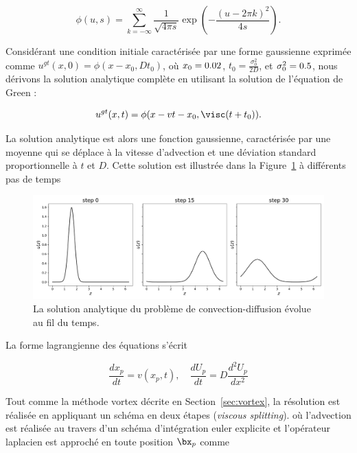 \begin{equation*}
    \phi(u, s) = \sum_{k=-\infty}^{\infty} \frac{1}{\sqrt{4 \pi s}} \exp{\left(-\frac{{(u - 2\pi k)}^2}{4s} \right)}.
\end{equation*}

Considérant une condition initiale caractérisée par une forme gaussienne exprimée comme $u^{gt}(x, 0) = \phi(x-x_0, Dt_0)$, où $x_0 = 0.02$, $t_0 = \frac{\sigma_0^2}{2D}$, et $\sigma_0^2 = 0.5$, nous dérivons la solution analytique complète en utilisant la solution de l'équation de Green :

\begin{equation*}
    u^{gt}(x, t) = \phi(x- v t - x_0, \visc (t+t_0)).
\end{equation*}

La solution analytique est alors une fonction gaussienne, caractérisée par une moyenne qui se déplace à la vitesse d'advection et une déviation standard proportionnelle à $t$ et $D$. Cette solution est illustrée dans la Figure~\ref{fig:1d_analytical} à différents pas de temps

\begin{figure}[ht]
    \centering
    \includegraphics[width=\linewidth]{images/app1d/analytical_frame.pdf}
    \caption{La solution analytique du problème de convection-diffusion évolue au fil du temps.}
    \label{fig:1d_analytical}
\end{figure}

La forme lagrangienne des équations s'écrit

\begin{equation*}
    \frac{dx_p}{dt} = v(x_p, t), \quad \frac{dU_p}{dt} = D \frac{d^2 U_p}{dx^2}
\end{equation*}

Tout comme la méthode vortex décrite en Section~\ref{sec:vortex}, la résolution est réalisée en appliquant un schéma en deux étapes (\textit{viscous splitting}). où l'advection est réalisée au travers d'un schéma d'intégration euler explicite et l'opérateur laplacien est approché en toute position $\bx_p$ comme

